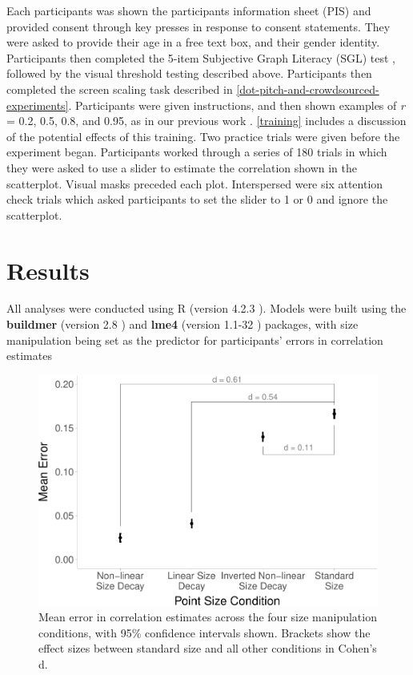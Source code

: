 \documentclass{vgtc}                          %
\begin{document}
Each participants was shown the participants information sheet (PIS) and provided
consent through key presses in response to consent statements. They were asked
to provide their age in a free text box, and their gender identity. Participants
then completed the 5-item Subjective Graph Literacy (SGL) test \cite{garcia_2016},
followed by the visual threshold testing described above. Participants then completed
the screen scaling task described in \autoref{dot-pitch-and-crowdsourced-experiments}.
Participants were given instructions, and then shown examples of \emph{r} = 0.2, 0.5, 0.8, and
0.95, as in our previous work \cite{strain_2023}. \autoref{training} includes
a discussion of the potential effects of this training. Two practice trials were
given before the experiment began. Participants worked through a series of 180 trials
in which they were asked to use a slider to estimate the correlation shown in
the scatterplot. Visual masks preceded each plot. Interspersed were six attention check trials which asked
participants to set the slider to 1 or 0 and ignore the scatterplot.

\hypertarget{results}{%
\section{Results}\label{results}}

All analyses were conducted using R (version 4.2.3 \cite{r_core}). Models were
built using the \textbf{buildmer} (version 2.8 \cite{voeten_buildmer_2022}) and \textbf{lme4}
(version 1.1-32 \cite{bates_lme4_2015}) packages, with size manipulation being set
as the predictor for participants' errors in correlation estimates

\begin{figure}
\includegraphics[width=1\linewidth]{size_and_scatterplots_files/figure-latex/dot-plot-1} \caption{Mean error in correlation estimates across the four size manipulation conditions, with 95\% confidence intervals shown. Brackets show the effect sizes between standard size and all other conditions in Cohen's d.}\label{fig:dot-plot}
\end{figure}
\end{document}

